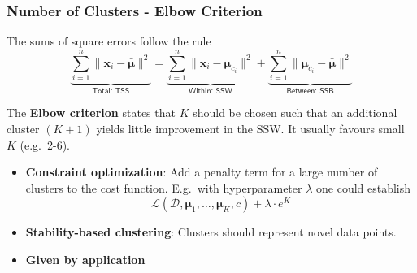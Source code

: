 \subsubsection{Number of Clusters - Elbow Criterion}
The sums of square errors follow the rule
\noindent\begin{equation*}
    \underbrace{\sum_{i=1}^{n}\|\mathbf{x}_i-\bar{\boldsymbol{\mu}}\|^2}_{\textsf{Total: TSS}} = \underbrace{\sum_{i=1}^{n}\|\mathbf{x}_i-\boldsymbol{\mu}_{c_i}\|^2}_{\textsf{Within: SSW}} + \underbrace{\sum_{i=1}^{n}\|\boldsymbol{\mu}_{c_i}-\bar{\boldsymbol{\mu}}\|^2}_{\textsf{Between: SSB}}
\end{equation*}

The \textbf{Elbow criterion} states that $K$ should be chosen such that an additional cluster $(K+1)$ yields little improvement in the SSW. It usually favours small $K$ (e.g.\ 2-6).

\begin{itemize}
    \item \textbf{Constraint optimization}: Add a penalty term for a large number of clusters to the cost function. E.g.\ with hyperparameter $\lambda$ one could establish
    \begin{equation*}
        \mathcal{L}(\mathcal{D},\boldsymbol{\mu}_1,\dots,\boldsymbol{\mu}_K,c)+\lambda\cdot e^K
    \end{equation*}
    \item \textbf{Stability-based clustering}: Clusters should represent novel data points.
    \item \textbf{Given by application}
\end{itemize}


